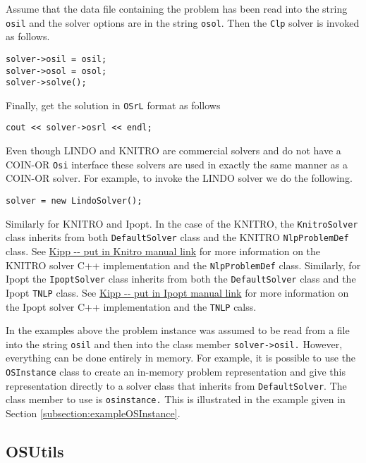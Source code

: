 \documentclass[11pt]{article}
\renewcommand{\_}{{\char"5F}}
\renewcommand{\{}{{\char"7B}}
\renewcommand{\}}{{\char"7D}}
\renewcommand{\^}{{\char"0D}}
\renewcommand{\'}{{\char"0D}}
\begin{document}
Assume that the data file containing the problem has been read into the string {\tt osil} and the solver options are in the string {\tt osol}. Then the {\tt Clp} solver is invoked as follows.

\begin{verbatim}
solver->osil = osil;
solver->osol = osol;
solver->solve();
\end{verbatim}

Finally, get the solution in {\tt OSrL} format as follows

\begin{verbatim}
cout << solver->osrl << endl;
\end{verbatim}

Even though LINDO and KNITRO are commercial solvers and do not have a COIN-OR {\tt Osi} interface these solvers are used in exactly the same manner as a COIN-OR solver. For example, to invoke the LINDO solver we do the following.

\begin{verbatim}
solver = new LindoSolver();	
\end{verbatim}

Similarly for KNITRO and Ipopt. In the case of the KNITRO, the {\tt KnitroSolver} class inherits from both {\tt DefaultSolver} class and the KNITRO {\tt NlpProblemDef} class. See \url{Kipp -- put in Knitro manual link} for more information on the KNITRO solver C++ implementation and the {\tt NlpProblemDef} class. Similarly, for Ipopt the {\tt IpoptSolver} class inherits from both the  {\tt DefaultSolver} class and the Ipopt {\tt TNLP} class.  See \url{Kipp -- put in Ipopt manual link} for more information on the Ipopt solver C++ implementation and the {\tt TNLP} calss.

In the examples above the problem instance was assumed to be read from a file into the string {\tt osil} and then into the class member {\tt solver->osil.} However, everything can be done entirely in memory. For example, it is possible to use the {\tt OSInstance} class to create an in-memory problem representation and give this representation directly to a solver class that inherits from {\tt DefaultSolver}. The class member to use is {\tt osinstance.} This is illustrated in the example given in Section \ref{subsection:exampleOSInstance}.


\subsection{OSUtils}
\end{document}
